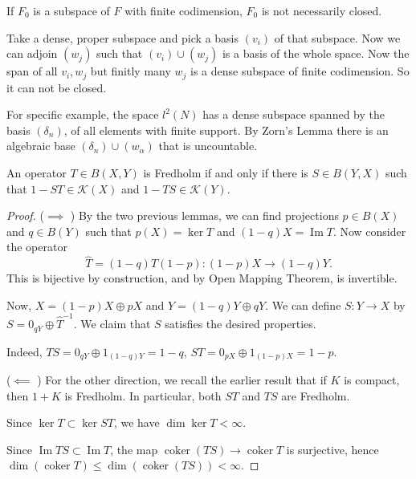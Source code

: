 \begin{example}
	If $F_0$ is a subspace of $F$ with finite codimension, $F_0$ is not necessarily closed. 

	Take a dense, proper subspace and pick a basis $\left(v_i\right)$ of that subspace. Now we can adjoin $\left(w_j\right)$ such that $\left(v_i\right) \cup\left(w_j\right)$ is a basis of the whole space. Now the span of all $v_i, w_j$ but finitly many $w_j$ is a dense subspace of finite codimension. So it can not be closed.

	For specific example, the space $l^2(N)$ has a dense subspace spanned by the basis $(\delta_n)$, of all elements with finite support. By Zorn's Lemma there is an algebraic base $(\delta_n) \cup (w_\alpha)$ that is uncountable.
\end{example}

\begin{theorem}
	\label{thm:Atkinsthm}
	An operator $T \in B(X,Y)$ is Fredholm if and only if there is $S \in B(Y, X)$ such that $1 - S T \in \mathcal{K}(X)$ and $1 - T S\in \mathcal{K}(Y)$.
\end{theorem}
\begin{proof}
	($\implies$ )
	By the two previous lemmas, we can find projections $p \in B(X)$ and  $q \in B(Y)$ such that $p(X) = \operatorname{ker} T$ and $(1-q)X = \operatorname{Im} T$. Now consider the operator
	\[
		\hat{T}  = (1 - q) T (1 -p) : (1 - p) X \to (1 - q)Y
	.\] 
	This is bijective by construction, and by Open Mapping Theorem, is invertible. 

	Now, $X = (1 - p) X \oplus p X$ and $Y = (1 - q) Y \oplus q Y$. We can define $S: Y \to X$ by $S = 0_{qY} \oplus \hat{T} ^{-1}$. We claim that $S$ satisfies the desired properties.

	Indeed, $T S = 0_{q Y} \oplus 1_{(1 - q)Y} = 1 - q$, $S T = 0_{p X} \oplus 1_{(1 - p)X} = 1 - p$.


	($\impliedby$ )
	For the other direction, we recall the earlier result that if $K$ is compact, then $1 + K$ is Fredholm. In particular, both $ST$ and $TS$ are Fredholm.

	Since $\operatorname{ker} T \subset \operatorname{ker} ST$, we have $\operatorname{dim} \operatorname{ker} T < \infty $. 

	Since $\operatorname{Im} TS \subset \operatorname{Im} T$, the map $\operatorname{coker} (TS) \to \operatorname{coker} T$ is surjective, hence $\operatorname{dim} (\operatorname{coker} T) \le \operatorname{dim} \left( \operatorname{coker} (TS) \right) < \infty $.
\end{proof}

